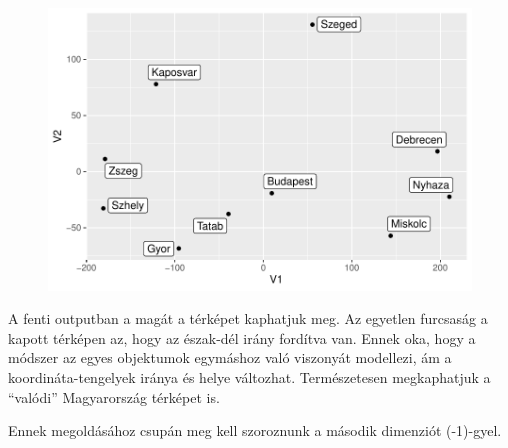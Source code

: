 \documentclass[
  letterpaper,
]{krantz}
\makeatletter
\newenvironment{Shaded}{\begin{snugshade}}{\end{snugshade}}
\newcommand{\AttributeTok}[1]{\textcolor[rgb]{0.40,0.45,0.13}{#1}}
\newcommand{\DecValTok}[1]{\textcolor[rgb]{0.68,0.00,0.00}{#1}}
\newcommand{\FunctionTok}[1]{\textcolor[rgb]{0.28,0.35,0.67}{#1}}
\newcommand{\NormalTok}[1]{\textcolor[rgb]{0.00,0.23,0.31}{#1}}
\newcommand{\OtherTok}[1]{\textcolor[rgb]{0.00,0.23,0.31}{#1}}
\newcommand{\SpecialCharTok}[1]{\textcolor[rgb]{0.37,0.37,0.37}{#1}}
\newenvironment{kframe}{%
\medskip{}
\setlength{\fboxsep}{.8em}
 \def\at@end@of@kframe{}%
 \ifinner\ifhmode%
  \def\at@end@of@kframe{\end{minipage}}%
  \begin{minipage}{\columnwidth}%
 \fi\fi%
 \def\FrameCommand##1{\hskip\@totalleftmargin \hskip-\fboxsep
 \colorbox{shadecolor}{##1}\hskip-\fboxsep
     \hskip-\linewidth \hskip-\@totalleftmargin \hskip\columnwidth}%
 \MakeFramed {\advance\hsize-\width
   \@totalleftmargin\z@ \linewidth\hsize
   \@setminipage}}%
 {\par\unskip\endMakeFramed%
 \at@end@of@kframe}
\renewenvironment{Shaded}{\begin{kframe}}{\end{kframe}}
\makeatother
\begin{document}
\begin{Shaded}
\end{Shaded}

\begin{figure}[H]

{\centering \includegraphics{./sec_tobbdimenzios_skalazas_files/figure-pdf/unnamed-chunk-11-1.pdf}

}

\end{figure}

A fenti outputban a magát a térképet kaphatjuk meg. Az egyetlen
furcsaság a kapott térképen az, hogy az észak-dél irány fordítva van.
Ennek oka, hogy a módszer az egyes objektumok egymáshoz való viszonyát
modellezi, ám a koordináta-tengelyek iránya és helye változhat.
Természetesen megkaphatjuk a ``valódi'' Magyarország térképet is.

Ennek megoldásához csupán meg kell szoroznunk a második dimenziót
(-1)-gyel.

\begin{Shaded}
\end{Shaded}
\end{document}
